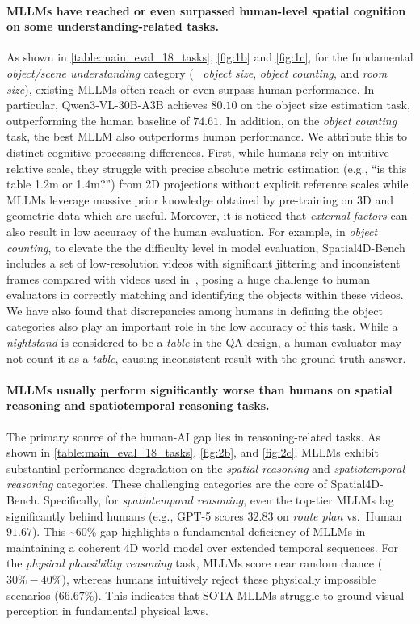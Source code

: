 \paragraph{MLLMs have reached or even surpassed human-level spatial cognition on some understanding-related tasks.}
As shown in \cref{table:main_eval_18_tasks}, \cref{fig:1b} and \cref{fig:1c}, for the fundamental \textit{object/scene understanding} category (\eg~ \textit{object size}, \textit{object counting}, and \textit{room size}), existing MLLMs often reach or even surpass human performance.
In particular, Qwen3-VL-30B-A3B achieves $80.10$ on the object size estimation task, outperforming the human baseline of $74.61$.
In addition, on the \textit{object counting} task, the best MLLM also outperforms human performance. We attribute this to distinct cognitive processing differences. 
First, while humans rely on intuitive relative scale, they struggle with precise absolute metric estimation (e.g., ``is this table 1.2m or 1.4m?'') from 2D projections without explicit reference scales while MLLMs leverage massive prior knowledge obtained by pre-training on 3D and geometric data which are useful. Moreover, it is noticed that \textit{external factors} can also result in low accuracy of the human evaluation. For example, in \textit{object counting}, to elevate the the difficulty level in model evaluation, Spatial4D-Bench includes a set of low-resolution videos with significant jittering and inconsistent frames compared with videos used in~\cite{Yang_2025_CVPR}, posing a huge challenge to human evaluators in correctly matching and identifying the objects within these videos. We have also found that discrepancies among humans in defining the object categories also play an important role in the low accuracy of this task. While a \textit{nightstand} is considered to be a \textit{table} in the QA design, a human evaluator may not count it as a \textit{table}, causing inconsistent result with the ground truth answer.

\paragraph{MLLMs usually perform significantly worse than humans on spatial reasoning and spatiotemporal reasoning tasks.} The primary source of the human-AI gap lies in reasoning-related tasks.
As shown in \cref{table:main_eval_18_tasks}, \cref{fig:2b}, and \cref{fig:2c}, MLLMs exhibit substantial performance degradation on the \textit{spatial reasoning} and \textit{spatiotemporal reasoning} categories.
These challenging categories are the core of Spatial4D-Bench.
Specifically, for \textit{spatiotemporal reasoning}, even the top-tier MLLMs lag significantly behind humans (e.g., GPT-5 scores $32.83$ on \textit{route plan} vs.\ Human $91.67$).
This \textasciitilde$60\%$ gap highlights a fundamental deficiency of MLLMs in maintaining a coherent 4D world model over extended temporal sequences.
For the \textit{physical plausibility reasoning} task, MLLMs score near random chance ($30\%-40\%$), whereas humans intuitively reject these physically impossible scenarios ($66.67\%$).
This indicates that SOTA MLLMs struggle to ground visual perception in fundamental physical laws.




